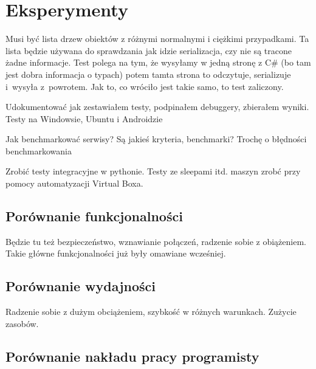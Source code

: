 \chapter{Eksperymenty}
Musi być lista drzew obiektów z różnymi normalnymi i ciężkimi przypadkami. Ta lista będzie używana do sprawdzania jak idzie serializacja, czy nie są tracone żadne informacje. Test polega na tym, że wysyłamy w jedną stronę z C\# (bo tam jest dobra informacja o typach) potem tamta strona to odczytuje, serializuje i~wysyła z~powrotem. Jak to, co wróciło jest takie samo, to test zaliczony.

Udokumentować jak zestawiałem testy, podpinałem debuggery, zbierałem wyniki.
Testy na Windowsie, Ubuntu i Androidzie

Jak benchmarkować serwisy? Są jakieś kryteria, benchmarki? Trochę o błędności benchmarkowania

Zrobić testy integracyjne w pythonie. Testy ze sleepami itd. maszyn zrobć przy pomocy automatyzacji Virtual Boxa.

\section{Porównanie funkcjonalności}
Będzie tu też bezpieczeństwo, wznawianie połączeń, radzenie sobie z obiążeniem. Takie główne funkcjonalności już były omawiane wcześniej.

\section{Porównanie wydajności}
Radzenie sobie z dużym obciążeniem, szybkość w różnych warunkach. Zużycie zasobów.

\section{Porównanie nakładu pracy programisty}